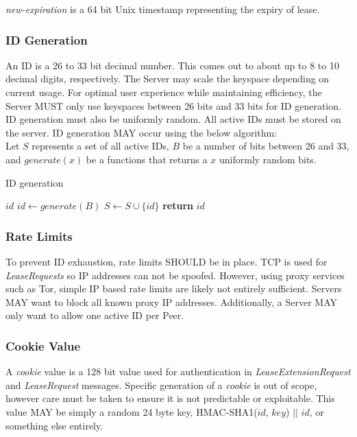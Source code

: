 \documentclass{article}
\begin{document}
    \emph{new-expiration} is a 64 bit Unix timestamp representing the expiry of lease.

    \subsubsection{ID Generation}

    An ID is a 26 to 33 bit decimal number. This comes out to about up to 8 to 10 decimal digits, respectively. The
    Server may scale the keyspace depending on current usage. For optimal user experience while maintaining
    efficiency, the Server MUST only use keyspaces between 26 bits and 33 bits for ID generation. ID generation must
    also be uniformly random. All active IDs must be stored on the server. ID generation MAY occur using the below
    algorithm:\\

    Let $S$ represents a set of all active IDs, $B$ be a number of bits between 26 and 33, and $generate(x)$ be a
    functions that returns a $x$ uniformly random bits.

    \begin{algorithm}
        \caption{ID generation}
        \begin{algorithmic}
            \State $id$
            \Repeat
                \State $id\gets generate(B)$
            \State $S\gets S\cup \{id\}$
            \State \textbf{return} $id$
        \end{algorithmic}
    \end{algorithm}

    \subsubsection{Rate Limits}

    To prevent ID exhaustion, rate limits SHOULD be in place. TCP is used for \emph{LeaseRequests} so IP addresses
    can not be spoofed. However, using proxy services such as Tor, simple IP based rate limits are likely not
    entirely sufficient. Servers MAY want to block all known proxy IP addresses. Additionally, a Server MAY only want
    to allow one active ID per Peer.

    \subsubsection{Cookie Value}

    A \emph{cookie} value is a 128 bit value used for authentication in \emph{LeaseExtensionRequest} and
    \emph{LeaseRequest} messages. Specific generation of a \emph{cookie} is out of scope, however care must be taken
    to ensure it is not predictable or exploitable. This value MAY be simply a random 24 byte key, HMAC-SHA1($id$,
    $key$) $||$ $id$, or something else entirely.
\end{document}

